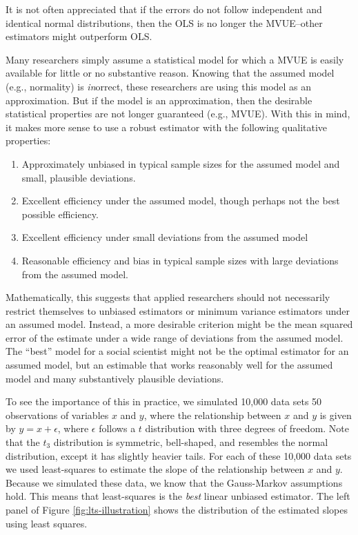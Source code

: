 \documentclass[10pt]{article}
\begin{document}
It is not often appreciated that if the errors do not follow independent and identical normal distributions, then the OLS is no longer the MVUE--other estimators might outperform OLS.

Many researchers simply assume a statistical model for which a MVUE is easily available for little or no substantive reason. Knowing that the assumed model (e.g., normality) is \textit{in}orrect, these researchers are using this model as an approximation. But if the model is an approximation, then the desirable statistical properties are not longer guaranteed (e.g., MVUE). With this in mind, it makes more sense to use a robust estimator with the following qualitative properties:
\begin{enumerate}
\item Approximately unbiased in typical sample sizes for the assumed model and small, plausible deviations.
\item Excellent efficiency under the assumed model, though perhaps not the best possible efficiency.
\item Excellent efficiency under small deviations from the assumed model
\item Reasonable efficiency and bias in typical sample sizes with large deviations from the assumed model. 
\end{enumerate}

Mathematically, this suggests that applied researchers should not necessarily restrict themselves to unbiased estimators or minimum variance estimators under an assumed model. Instead, a more desirable criterion might be the mean squared error of the estimate under a wide range of deviations from the assumed model. The ``best'' model for a social scientist might not be the optimal estimator for an assumed model, but an estimable that works reasonably well for the assumed model and many substantively plausible deviations. 

To see the importance of this in practice, we simulated 10,000 data sets 50 observations of variables $x$ and $y$, where the relationship between $x$ and $y$ is given by $y = x + \epsilon$, where $\epsilon$ follows a $t$ distribution with three degrees of freedom. Note that the $t_3$ distribution is symmetric, bell-shaped, and resembles the normal distribution, except it has slightly heavier tails. For each of these 10,000 data sets we used least-squares to estimate the slope of the relationship between $x$ and $y$. Because we simulated these data, we know that the Gauss-Markov assumptions hold. This means that least-squares is the \textit{best} linear unbiased estimator. The left panel of Figure \ref{fig:lts-illustration} shows the distribution of the estimated slopes using least squares.
\end{document}
